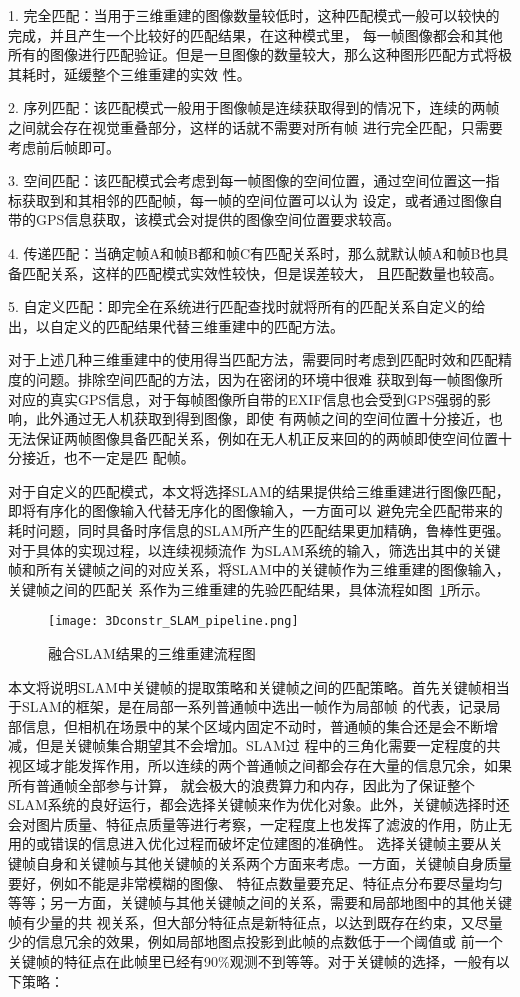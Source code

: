 1.  完全匹配：当用于三维重建的图像数量较低时，这种匹配模式一般可以较快的完成，并且产生一个比较好的匹配结果，在这种模式里，
每一帧图像都会和其他所有的图像进行匹配验证。但是一旦图像的数量较大，那么这种图形匹配方式将极其耗时，延缓整个三维重建的实效
性。

2.  序列匹配：该匹配模式一般用于图像帧是连续获取得到的情况下，连续的两帧之间就会存在视觉重叠部分，这样的话就不需要对所有帧
进行完全匹配，只需要考虑前后帧即可。

3.  空间匹配：该匹配模式会考虑到每一帧图像的空间位置，通过空间位置这一指标获取到和其相邻的匹配帧，每一帧的空间位置可以认为
设定，或者通过图像自带的GPS信息获取，该模式会对提供的图像空间位置要求较高。

4.  传递匹配：当确定帧A和帧B都和帧C有匹配关系时，那么就默认帧A和帧B也具备匹配关系，这样的匹配模式实效性较快，但是误差较大，
且匹配数量也较高。

5.  自定义匹配：即完全在系统进行匹配查找时就将所有的匹配关系自定义的给出，以自定义的匹配结果代替三维重建中的匹配方法。

对于上述几种三维重建中的使用得当匹配方法，需要同时考虑到匹配时效和匹配精度的问题。排除空间匹配的方法，因为在密闭的环境中很难
获取到每一帧图像所对应的真实GPS信息，对于每帧图像所自带的EXIF信息也会受到GPS强弱的影响，此外通过无人机获取到得到图像，即使
有两帧之间的空间位置十分接近，也无法保证两帧图像具备匹配关系，例如在无人机正反来回的的两帧即使空间位置十分接近，也不一定是匹
配帧。

对于自定义的匹配模式，本文将选择SLAM的结果提供给三维重建进行图像匹配，即将有序化的图像输入代替无序化的图像输入，一方面可以
避免完全匹配带来的耗时问题，同时具备时序信息的SLAM所产生的匹配结果更加精确，鲁棒性更强。对于具体的实现过程，以连续视频流作
为SLAM系统的输入，筛选出其中的关键帧和所有关键帧之间的对应关系，将SLAM中的关键帧作为三维重建的图像输入，关键帧之间的匹配关
系作为三维重建的先验匹配结果，具体流程如图~\ref{fig:3Dconstr_SLAM_pipeline}所示。
\begin{figure}[H] %
  \centering
  \texttt{[image: 3Dconstr\_SLAM\_pipeline.png]}
  \caption{融合SLAM结果的三维重建流程图}
  \label{fig:3Dconstr_SLAM_pipeline}
\end{figure}
本文将说明SLAM中关键帧的提取策略和关键帧之间的匹配策略。首先关键帧相当于SLAM的框架，是在局部一系列普通帧中选出一帧作为局部帧
的代表，记录局部信息，但相机在场景中的某个区域内固定不动时，普通帧的集合还是会不断增减，但是关键帧集合期望其不会增加。SLAM过
程中的三角化需要一定程度的共视区域才能发挥作用，所以连续的两个普通帧之间都会存在大量的信息冗余，如果所有普通帧全部参与计算，
就会极大的浪费算力和内存，因此为了保证整个SLAM系统的良好运行，都会选择关键帧来作为优化对象。此外，关键帧选择时还会对图片质量、特征点质量等进行考察，一定程度上也发挥了滤波的作用，防止无用的或错误的信息进入优化过程而破坏定位建图的准确性。
选择关键帧主要从关键帧自身和关键帧与其他关键帧的关系两个方面来考虑。一方面，关键帧自身质量要好，例如不能是非常模糊的图像、
特征点数量要充足、特征点分布要尽量均匀等等；另一方面，关键帧与其他关键帧之间的关系，需要和局部地图中的其他关键帧有少量的共
视关系，但大部分特征点是新特征点，以达到既存在约束，又尽量少的信息冗余的效果，例如局部地图点投影到此帧的点数低于一个阈值或
前一个关键帧的特征点在此帧里已经有90$\%$观测不到等等。对于关键帧的选择，一般有以下策略：

